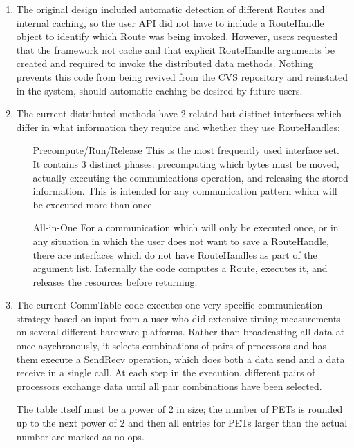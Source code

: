 \begin{enumerate}
\item

The original design included automatic detection of different
Routes and internal caching, so the user API did not have to
include a RouteHandle object to identify which Route was
being invoked.  However, users requested that the framework
not cache and that explicit RouteHandle arguments be created
and required to invoke the distributed data methods.
Nothing prevents this code from being revived from the CVS
repository and reinstated in the system, should automatic
caching be desired by future users.

\item

The current distributed methods have 2 related but distinct
interfaces which differ in what information they require
and whether they use RouteHandles:

\begin{enumerate}
\item[Precompute/Run/Release]
This is the most frequently used interface set.
It contains 3 distinct phases: precomputing which bytes must
be moved, actually executing the communications operation,
and releasing the stored information.  This is intended for
any communication pattern which will be executed more than once.
\item[All-in-One]
For a communication which will only be executed once, or in
any situation in which the user does not want to save a RouteHandle,
there are interfaces which do not have RouteHandles as part of
the argument list.  Internally the code computes a Route,
executes it, and releases the resources before returning.
\end{enumerate}

\item

The current CommTable code executes one very specific communication
strategy based on input from a user who did extensive timing
measurements on several different hardware platforms.  Rather than
broadcasting all data at once asychronously, it selects combinations
of pairs of processors and has them execute a SendRecv operation, which
does both a data send and a data receive in a single call.
At each step in the execution, different pairs of processors
exchange data until all pair combinations have been selected.

The table itself must be a power of 2 in size; the number of
PETs is rounded up to the next power of 2 and then all entries
for PETs larger than the actual number are marked as no-ops.


\end{enumerate}
